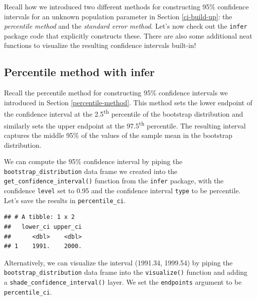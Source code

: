 \documentclass[
]{book}
\newenvironment{Shaded}{\begin{snugshade}}{\end{snugshade}}
\newcommand{\DataTypeTok}[1]{\textcolor[rgb]{0.13,0.29,0.53}{#1}}
\newcommand{\FloatTok}[1]{\textcolor[rgb]{0.00,0.00,0.81}{#1}}
\newcommand{\KeywordTok}[1]{\textcolor[rgb]{0.13,0.29,0.53}{\textbf{#1}}}
\newcommand{\NormalTok}[1]{#1}
\newcommand{\OperatorTok}[1]{\textcolor[rgb]{0.81,0.36,0.00}{\textbf{#1}}}
\newcommand{\StringTok}[1]{\textcolor[rgb]{0.31,0.60,0.02}{#1}}
\begin{document}
Recall how we introduced two different methods for constructing 95\% confidence intervals for an unknown population parameter in Section \ref{ci-build-up}: the \emph{percentile method} and the \emph{standard error method}. Let's now check out the \texttt{infer} package code that explicitly constructs these. There are also some additional neat functions to visualize the resulting confidence intervals built-in!

\hypertarget{percentile-method-infer}{%
\subsection{Percentile method with infer}\label{percentile-method-infer}}

Recall the percentile method for constructing 95\% confidence intervals we introduced in Section \ref{percentile-method}. This method sets the lower endpoint of the confidence interval at the 2.5\textsuperscript{th} percentile of the bootstrap distribution and similarly sets the upper endpoint at the 97.5\textsuperscript{th} percentile. The resulting interval captures the middle 95\% of the values of the sample mean in the bootstrap distribution.

We can compute the 95\% confidence interval by piping the \texttt{bootstrap\_distribution} data frame we created into the \texttt{get\_confidence\_interval()}  function from the \texttt{infer} package, with the confidence \texttt{level} set to 0.95 and the confidence interval \texttt{type} to be percentile. Let's save the results in \texttt{percentile\_ci}.

\begin{Shaded}
\end{Shaded}

\begin{verbatim}
## # A tibble: 1 x 2
##   lower_ci upper_ci
##      <dbl>    <dbl>
## 1    1991.    2000.
\end{verbatim}

Alternatively, we can visualize the interval (1991.34, 1999.54) by piping the \texttt{bootstrap\_distribution} data frame into the \texttt{visualize()} function and adding a \texttt{shade\_confidence\_interval()}  layer. We set the \texttt{endpoints} argument to be \texttt{percentile\_ci}.
\end{document}
